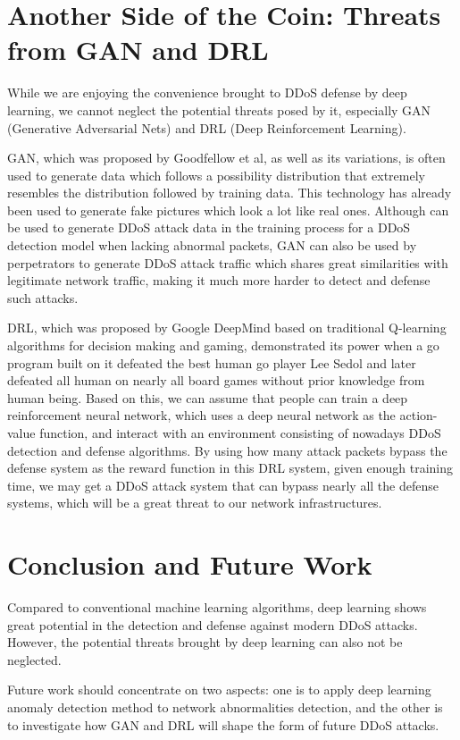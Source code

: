 \documentclass[paper=a4, fontsize=12pt]{scrartcl} %
\numberwithin{equation}{section} %
\numberwithin{figure}{section} %
\numberwithin{table}{section} %
\begin{document}
\section{Another Side of the Coin: Threats from GAN and DRL} 

While we are enjoying the convenience brought to DDoS defense by deep learning, we cannot neglect the potential threats posed by it, especially GAN (Generative Adversarial Nets) and DRL (Deep Reinforcement Learning).

GAN, which was proposed by Goodfellow et al, as well as its variations, is often used to generate data which follows a possibility distribution that extremely resembles the distribution followed by training data\cite{NIPS2014_5423}. This technology has already been used to generate fake pictures which look a lot like real ones. Although can be used to generate DDoS attack data in the training process for a DDoS detection model when lacking abnormal packets, GAN can also be used by perpetrators to generate DDoS attack traffic which shares great similarities with legitimate network traffic, making it much more harder to detect and defense such attacks.

DRL, which was proposed by Google DeepMind based on traditional Q-learning algorithms \cite{mnih2015humanlevel} for decision making and gaming, demonstrated its power when a go program built on it defeated the best human go player Lee Sedol \cite{Silver_2016} and later defeated all human on nearly all board games \cite{alphagozero} without prior knowledge from human being. Based on this, we can assume that people can train a deep reinforcement neural network, which uses a deep neural network as the action-value function, and interact with an environment consisting of nowadays DDoS detection and defense algorithms. By using how many attack packets bypass the defense system as the reward function in this DRL system, given enough training time, we may get a DDoS attack system that can bypass nearly all the defense systems, which will be a great threat to our network infrastructures.

\section{Conclusion and Future Work}

Compared to conventional machine learning algorithms, deep learning shows great potential in the detection and defense against modern DDoS attacks. However, the potential threats brought by deep learning can also not be neglected. 

Future work should concentrate on two aspects: one is to apply deep learning anomaly detection method to network abnormalities detection, and the other is to investigate how GAN and DRL will shape the form of future DDoS attacks.









\newpage
        
        
\end{document}

